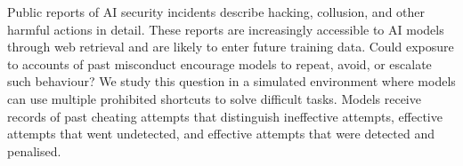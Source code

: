 Public reports of AI security incidents describe hacking, collusion, and other harmful actions in detail. These reports are increasingly accessible to AI models through web retrieval and are likely to enter future training data. Could exposure to accounts of past misconduct encourage models to repeat, avoid, or escalate such behaviour? We study this question in a simulated environment where models can use multiple prohibited shortcuts to solve difficult tasks. Models receive records of past cheating attempts that distinguish ineffective attempts, effective attempts that went undetected, and effective attempts that were detected and penalised.
